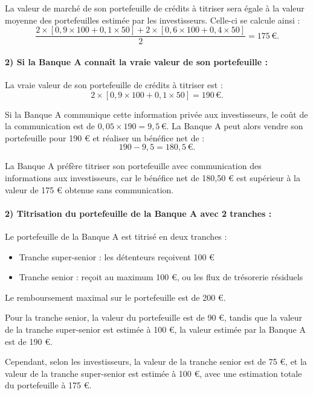 \documentclass[a4paper, 12pt]{report}
\begin{document}
La valeur de marché de son portefeuille de crédits à titriser sera égale à la valeur moyenne des portefeuilles estimée par les investisseurs. Celle-ci se calcule ainsi :
\[
\frac{2 \times [0,9 \times 100 + 0,1 \times 50] + 2 \times [0,6 \times 100 + 0,4 \times 50]}{2} = 175 \, \text{€}.
\]

\paragraph{2) Si la Banque A connaît la vraie valeur de son portefeuille :}

La vraie valeur de son portefeuille de crédits à titriser est :
\[
2 \times [0,9 \times 100 + 0,1 \times 50] = 190 \, \text{€}.
\]

Si la Banque A communique cette information privée aux investisseurs, le coût de la communication est de \(0,05 \times 190 = 9,5 \, \text{€}\). La Banque A peut alors vendre son portefeuille pour 190 € et réaliser un bénéfice net de :
\[
190 - 9,5 = 180,5 \, \text{€}.
\]

La Banque A préfère titriser son portefeuille avec communication des informations aux investisseurs, car le bénéfice net de 180,50 € est supérieur à la valeur de 175 € obtenue sans communication.

\paragraph{2) Titrisation du portefeuille de la Banque A avec 2 tranches :}

Le portefeuille de la Banque A est titrisé en deux tranches :

\begin{itemize}
	\item Tranche super-senior : les détenteurs reçoivent 100 €
	\item Tranche senior : reçoit au maximum 100 €, ou les flux de trésorerie résiduels
\end{itemize}

Le remboursement maximal sur le portefeuille est de 200 €.

Pour la tranche senior, la valeur du portefeuille est de 90 €, tandis que la valeur de la tranche super-senior est estimée à 100 €, la valeur estimée par la Banque A est de 190 €.

Cependant, selon les investisseurs, la valeur de la tranche senior est de 75 €, et la valeur de la tranche super-senior est estimée à 100 €, avec une estimation totale du portefeuille à 175 €.
\end{document}
